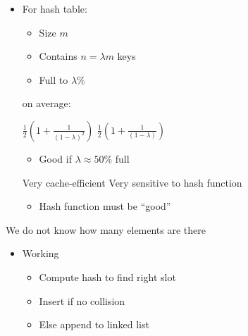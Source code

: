 \begin{itemize}
\begin{itemize}
\begin{itemize}
\begin{itemize}
                            \item For hash table:
                                \begin{itemize}
                                    \item Size $m$
                                    \item Contains $n = \lambda m$ keys
                                    \item Full to $\lambda \%$
                                \end{itemize}
                                on average:
                                \begin{itemize}
                                     $\frac{1}{2} (1 + \frac{1}{(1 - \lambda)^2})$
                                 $\frac{1}{2} (1 + \frac{1}{(1 - \lambda)})$
                                        \begin{itemize}
                                            \item Good if $\lambda \approx 50\%$ full
                                        \end{itemize}
                                \end{itemize}
                            \ipro Very cache-efficient
                            \icon Very sensitive to hash function
                                \begin{itemize}
                                    \item Hash function must be ``good''
                                \end{itemize}
                        \end{itemize}
                \end{itemize}
             We do not know how many elements are there
                \begin{itemize}
                        \begin{itemize}
                            \item Working
                                \begin{itemize}
                                    \item Compute hash to find right slot
                                    \item Insert if no collision
                                    \item Else append to linked list

\end{itemize}
\end{itemize}
\end{itemize}
\end{itemize}
\end{itemize}
